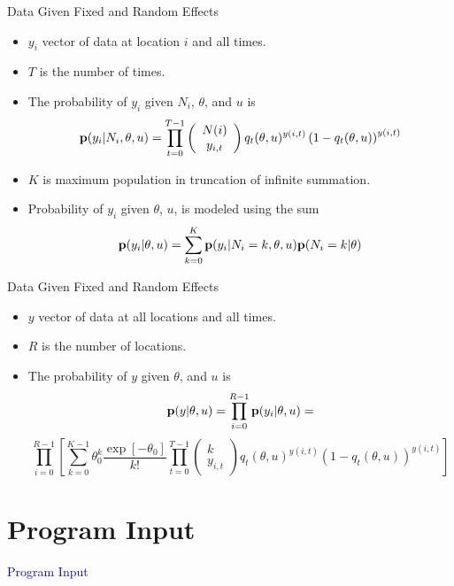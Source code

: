 \documentclass{beamer}
\newcommand{\Blue}[1]{\textcolor{blue}{#1}}
\newcommand{\B}[1]{{\bf #1}}
\newcommand{\Section}[1]{
	\section{#1}
	\begin{frame}
	\begin{center}
	\Blue{ \Large{#1} }
	\end{center}
	\end{frame}
}
\begin{document}
\begin{frame}{Data Given Fixed and Random Effects}
\begin{itemize}

\item
$y_i$ vector of data at location $i$ and all times.
\pause

\item
$T$ is the number of times.
\pause

\item
The probability of $y_i$ given $N_i$, $\theta$, and $u$ is
\[
\B{p}( y_i | N_i, \theta , u )
=
\prod_{t=0}^{T-1}
\left( \begin{array}{c} {N(i)} \\ y_{i,t} \end{array} \right)
	q_t ( \theta , u)^{y(i,t)}
	\left( 1 - q_t( \theta , u) \right)^{y(i,t)}
\]
\pause

\item
$K$ is maximum population in truncation of infinite summation.
\pause

\item
Probability of $y_i$ given $\theta$, $u$, is modeled using the sum
\[
\B{p}( y_i | \theta , u )
=
\sum_{k=0}^K \B{p}( y_i | N_i=k, \theta , u ) \B{p}( N_i=k | \theta )
\]
\pause

\end{itemize}
\end{frame}
%
\begin{frame}{Data Given Fixed and Random Effects}
\begin{itemize}

\item
$y$ vector of data at all locations and all times.
\pause
%
\item
$R$ is the number of locations.
\pause
%
\item
The probability of $y$ given $\theta$, and $u$ is
\[
\B{p}( y | \theta , u )
=
\prod_{i=0}^{R-1} \B{p}( y_i | \theta , u )
=
\]
\pause
\[
\prod_{i=0}^{R-1}
\left[
\sum_{k=0}^{K-1}
\theta_0^k \frac{ \exp[ - \theta_0 ] }{ k ! }
\prod_{t=0}^{T-1}
\left( \begin{array}{c} {k} \\ y_{i,t} \end{array} \right)
	q_t ( \theta , u)^{y(i,t)}
	\left( 1 - q_t( \theta , u) \right)^{y(i,t)}
\right]
\]

\end{itemize}
\end{frame}
\Section{Program Input}
\end{document}
